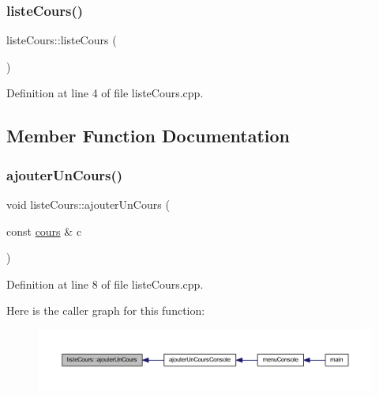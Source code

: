 \subsubsection{\texorpdfstring{liste\+Cours()}{listeCours()}}
{\footnotesize\ttfamily liste\+Cours\+::liste\+Cours (\begin{DoxyParamCaption}{ }\end{DoxyParamCaption})}



Definition at line 4 of file liste\+Cours.\+cpp.



\subsection{Member Function Documentation}
\hypertarget{classliste_cours_aacc38305cfea76d8cc77d710d144ce8b}{}\label{classliste_cours_aacc38305cfea76d8cc77d710d144ce8b} 
\subsubsection{\texorpdfstring{ajouter\+Un\+Cours()}{ajouterUnCours()}}
{\footnotesize\ttfamily void liste\+Cours\+::ajouter\+Un\+Cours (\begin{DoxyParamCaption}\item[{const \hyperlink{classcours}{cours} \&}]{c }\end{DoxyParamCaption})}



Definition at line 8 of file liste\+Cours.\+cpp.

Here is the caller graph for this function\+:\nopagebreak
\begin{figure}[H]
\begin{center}
\leavevmode
\includegraphics[width=350pt]{classliste_cours_aacc38305cfea76d8cc77d710d144ce8b_icgraph}
\end{center}
\end{figure}
\hypertarget{classliste_cours_a34b859c2380770eb560c0a6dcf01cc81}{}\label{classliste_cours_a34b859c2380770eb560c0a6dcf01cc81} 
